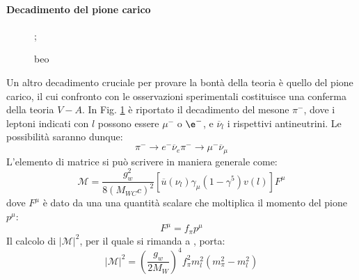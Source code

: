 \documentclass{subnucbo}
\begin{document}
\paragraph{Decadimento del pione carico}
\begin{figure}[!h]
        \centering
        ;
        \caption{beo}
        \label{fig:pion_decay}
\end{figure}
Un altro decadimento cruciale per provare la bontà della teoria è quello del pione carico, il cui confronto con le osservazioni sperimentali costituisce una conferma della teoria $V-A$. In Fig. \ref{fig:pion_decay} è riportato il decadimento del mesone $\pi^{-}$, dove i leptoni indicati con $l$ possono essere $\mu^{-}$ o $\e^{-}$, e $\overline{\nu}_{l}$ i rispettivi antineutrini. Le possibilità saranno dunque:
\begin{subequations}
        \begin{equation}
                \pi^{-} \rightarrow e^{-} \overline{\nu}_{e}
                \label{eq:pi_e}
        \end{equation}
        \begin{equation}
                \pi^{-} \rightarrow \mu^{-} \overline{\nu}_{\mu}
                \label{eq:pi_mu}
        \end{equation}
\end{subequations}
L'elemento di matrice si può scrivere in maniera generale come:
\begin{equation}
        \mathcal { M } = \frac { g _ { w } ^ { 2 } } { 8 \left( M _ { W C } c \right) ^ { 2 } } \left[ \overline { u } ( \nu_{l} ) \gamma _ { \mu } \left( 1 - \gamma ^ { 5 } \right) v ( l ) \right] F ^ { \mu }
        \label{eq:matrix_element_pion_decay}
\end{equation}
dove $F^{\mu}$ è dato da una una quantità scalare che moltiplica il momento del pione $p^{\mu}$:
\begin{equation}
        F ^ { \mu } = f _ { \pi } p ^ { \mu }
\end{equation}
Il calcolo di $|\mathcal{M}|^{2}$, per il quale si rimanda a \cite{ref:griff}, porta:
\begin{equation}
         | \mathcal { M } | ^ { 2 }  = \left( \frac { g _ { w } } { 2 M _ { W } } \right) ^ { 4 } f _ { \pi } ^ { 2 } m _ { l } ^ { 2 } \left( m _ { \pi } ^ { 2 } - m _ { l } ^ { 2 } \right)
\end{equation}
\end{document}
